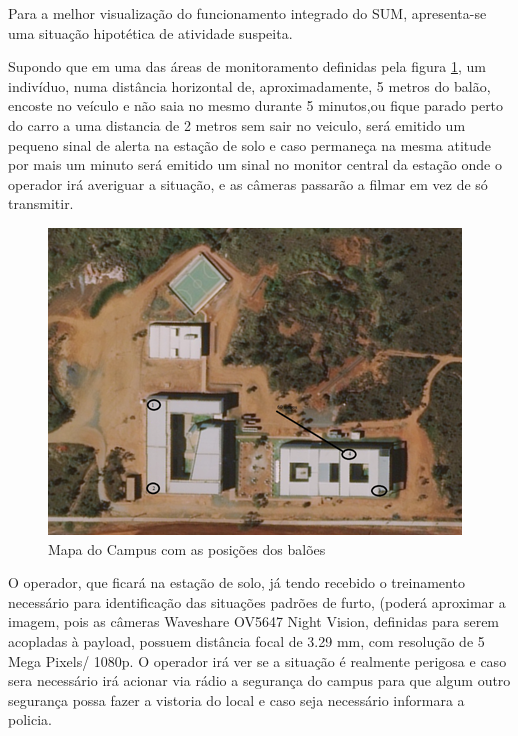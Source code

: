 Para a melhor visualização do funcionamento integrado do SUM, apresenta-se uma situação hipotética de atividade suspeita.

Supondo que em uma das áreas de monitoramento definidas pela figura \ref{img: Mapa do Campus com as posições dos balões}, um indivíduo, numa distância horizontal de, aproximadamente, 5 metros do balão, encoste no veículo e não saia no mesmo durante 5 minutos,ou fique parado perto do carro a uma distancia de 2 metros sem sair no veiculo, será emitido um pequeno sinal de alerta na estação de solo e caso permaneça na mesma atitude por mais um minuto será emitido um sinal no monitor central da estação onde o operador irá averiguar a situação, e as câmeras passarão a filmar em vez de só transmitir.

\begin{figure}[htp]
\centering
\includegraphics[scale=0.80]{figuras/campus}
\caption{Mapa do Campus com as posições dos balões}
\label{img: Mapa do Campus com as posições dos balões}
\end{figure}

O operador, que ficará na estação de solo, já tendo recebido o treinamento necessário para identificação das situações padrões de furto, (poderá aproximar a imagem, pois as câmeras Waveshare OV5647 Night Vision, definidas para serem acopladas à payload, possuem distância focal de 3.29 mm, com resolução de 5 Mega Pixels/ 1080p. O operador irá ver se a situação é realmente perigosa e caso sera necessário irá acionar  via rádio a segurança do campus para que algum outro segurança possa fazer a vistoria do local e caso seja necessário informara a policia.

